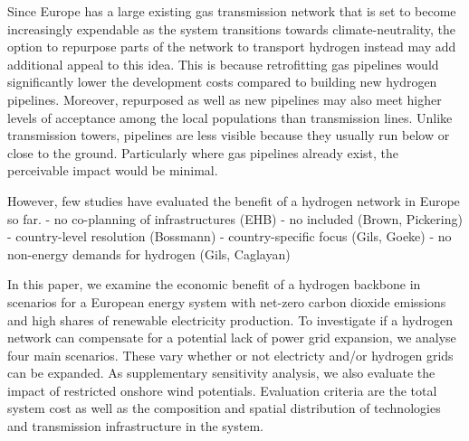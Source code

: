 
Since Europe has a large existing gas transmission network that is set to become
increasingly expendable as the system transitions towards climate-neutrality,
the option to repurpose parts of the network to transport hydrogen instead may
add additional appeal to this idea. This is because retrofitting gas pipelines
would significantly lower the development costs compared to building new
hydrogen pipelines. Moreover, repurposed as well as new pipelines may
also meet higher levels of acceptance among the local populations than
transmission lines. Unlike transmission towers, pipelines are less visible
because they usually run below or close to the ground. Particularly where gas
pipelines already exist, the perceivable impact would be minimal.


However, few studies have evaluated the benefit of a hydrogen network in Europe
so far.
- no co-planning of infrastructures (EHB)
- no included (Brown, Pickering)
- country-level resolution (Bossmann)
- country-specific focus (Gils, Goeke)
- no non-energy demands for hydrogen (Gils, Caglayan)


In this paper, we examine the economic benefit of a hydrogen backbone in
scenarios for a European energy system with net-zero carbon dioxide emissions
and high shares of renewable electricity production. To investigate if a
hydrogen network can compensate for a potential lack of power grid expansion, we
analyse four main scenarios. These vary whether or not electricty and/or
hydrogen grids can be expanded. As supplementary sensitivity analysis, we also
evaluate the impact of restricted onshore wind potentials. Evaluation criteria
are the total system cost as well as the composition and spatial distribution of
technologies and transmission infrastructure in the system.


